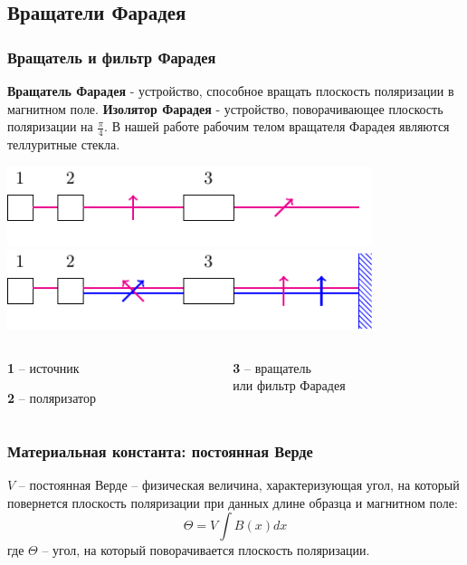 \documentclass[10pt,pdf,hyperref={unicode}, dvipsnames, handout]{beamer}
\begin{document}
\begin{frame}[t]
	\subsection{Вращатели Фарадея}
	\frametitle{Вращатель и фильтр Фарадея}
	\textbf{Вращатель Фарадея} - устройство, способное вращать плоскость поляризации в магнитном поле. \textbf{Изолятор Фарадея} - устройство, поворачивающее плоскость поляризации на $\frac{\pi}{4}$. В нашей работе рабочим телом вращателя Фарадея являются теллуритные стекла. 
	\begin{center}
		\includegraphics[width=0.8\textwidth]{img/rot}
		\includegraphics[width=0.8\textwidth]{img/zerc}
	\end{center}
	\begin{columns}
		\hspace{2.5cm}
		\begin{column}{0.3\textwidth}
			
			\textbf{1} -- источник
			
			\textbf{2} -- поляризатор
			
		\end{column}
		\hspace{1.6cm}
		\begin{column}{0.7\textwidth}
			
			\textbf{3} -- вращатель\\
			или фильтр Фарадея
		\end{column}
	\end{columns}
	
	
	
\end{frame}
\begin{frame}
	\frametitle{Материальная константа: постоянная Верде}
	$V$ -- постоянная Верде -- физическая величина, характеризующая угол, на который повернется плоскость поляризации при данных длине образца и магнитном поле:
	\begin{equation}
		\Theta=V \int B(x)dx
	\end{equation}
	где $\Theta$ -- угол, на который поворачивается плоскость поляризации.
\end{frame}
\end{document}
